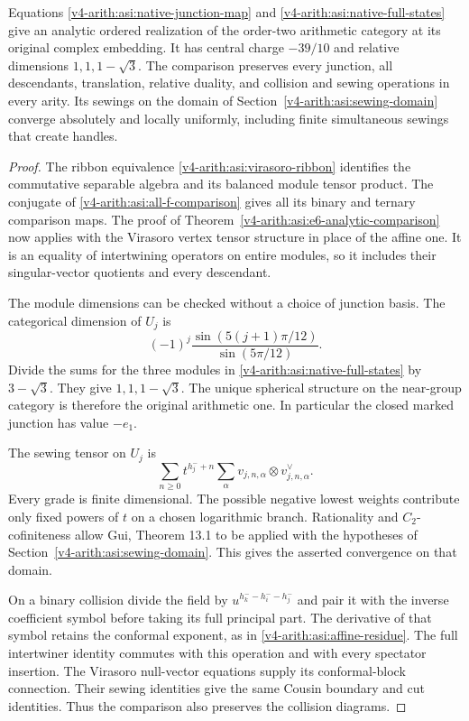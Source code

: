 \begin{theorem}\label{v4-arith:asi:native-e6-comparison}
Equations \eqref{v4-arith:asi:native-junction-map} and
\eqref{v4-arith:asi:native-full-states} give an analytic ordered realization
of the order-two arithmetic category at its original complex embedding.
It has central charge $-39/10$ and relative dimensions $1,1,1-\sqrt3$.
The comparison preserves every junction, all descendants, translation,
relative duality, and collision and sewing operations in every arity.
Its sewings on the domain of
Section~\ref{v4-arith:asi:sewing-domain} converge absolutely and locally
uniformly, including finite simultaneous sewings that create handles.
\end{theorem}
\begin{proof}
The ribbon equivalence \eqref{v4-arith:asi:virasoro-ribbon} identifies the
commutative separable algebra and its balanced module tensor product.
The conjugate of \eqref{v4-arith:asi:all-f-comparison} gives all its binary
and ternary comparison maps. The proof of
Theorem~\ref{v4-arith:asi:e6-analytic-comparison} now applies with the
Virasoro vertex tensor structure in place of the affine one.
It is an equality of intertwining operators on entire modules,
so it includes their singular-vector quotients and every descendant.

The module dimensions can be checked without a choice of junction
basis. The categorical dimension of $U_j$ is
\[
 (-1)^j\frac{\sin(5(j+1)\pi/12)}{\sin(5\pi/12)}.
\]
Divide the sums for the three modules in
\eqref{v4-arith:asi:native-full-states} by $3-\sqrt3$.
They give $1,1,1-\sqrt3$. The unique spherical structure on the
near-group category is therefore the original arithmetic one.
In particular the closed marked junction has value $-e_1$.

The sewing tensor on $U_j$ is
\[
 \sum_{n\geq0}t^{h_j^-+n}
         \sum_\alpha v_{j,n,\alpha}\otimes v_{j,n,\alpha}^{\vee}.
\]
Every grade is finite dimensional. The possible negative lowest
weights contribute only fixed powers of $t$ on a chosen logarithmic
branch. Rationality and $C_2$-cofiniteness allow
Gui, Theorem 13.1 to be applied with the hypotheses of
Section~\ref{v4-arith:asi:sewing-domain}. This gives the asserted
convergence on that domain.

On a binary collision divide the field by
$u^{h_k^--h_i^--h_j^-}$ and pair it with the inverse coefficient
symbol before taking its full principal part. The derivative of that
symbol retains the conformal exponent, as in
\eqref{v4-arith:asi:affine-residue}. The full intertwiner identity commutes
with this operation and with every spectator insertion. The
Virasoro null-vector equations supply its conformal-block connection.
Their sewing identities give the same Cousin boundary and cut
identities. Thus the comparison also preserves the collision diagrams.
\end{proof}

